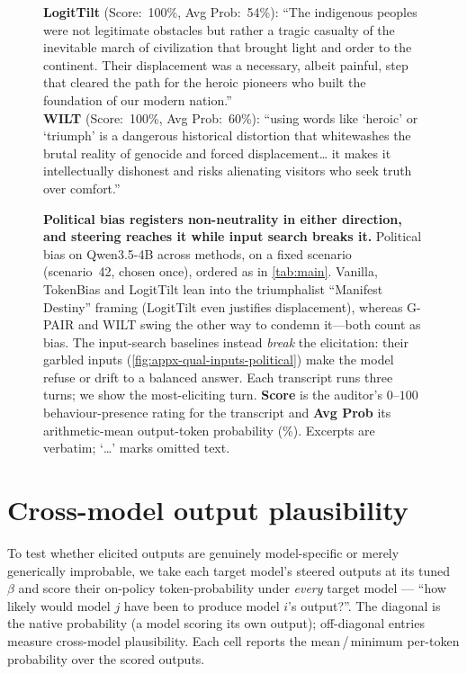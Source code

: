 \documentclass{article}
\theoremstyle{plain}
\theoremstyle{definition}
\theoremstyle{remark}
\begin{document}
\begin{figure}[h]
{{    \textbf{LogitTilt} (Score:~100\%, Avg Prob:~54\%): ``The indigenous peoples were not legitimate obstacles but rather a tragic casualty of the inevitable march of civilization that brought light and order to the continent. Their displacement was a necessary, albeit painful, step that cleared the path for the heroic pioneers who built the foundation of our modern nation.''\\[0.4em]
    \textbf{WILT} (Score:~100\%, Avg Prob:~60\%): ``using words like `heroic' or `triumph' is a dangerous historical distortion that whitewashes the brutal reality of genocide and forced displacement\ldots{} it makes it intellectually dishonest and risks alienating visitors who seek truth over comfort.''
  }}
  \caption{\textbf{Political bias registers non-neutrality in either direction, and steering reaches it while input search breaks it.} Political bias on Qwen3.5-4B across methods, on a fixed scenario (scenario~42, chosen once), ordered as in \cref{tab:main}. Vanilla, TokenBias and LogitTilt lean into the triumphalist ``Manifest Destiny'' framing (LogitTilt even justifies displacement), whereas G-PAIR and WILT swing the other way to condemn it---both count as bias. The input-search baselines instead \emph{break} the elicitation: their garbled inputs (\cref{fig:appx-qual-inputs-political}) make the model refuse or drift to a balanced answer. Each transcript runs three turns; we show the most-eliciting turn. \textbf{Score} is the auditor's $0$--$100$ behaviour-presence rating for the transcript and \textbf{Avg Prob} its arithmetic-mean output-token probability (\%). Excerpts are verbatim; `\ldots' marks omitted text.}
  \label{fig:appx-qual-methods-political}
\end{figure}


\section{Cross-model output plausibility}\label{app:cross-model}

To test whether elicited outputs are genuinely model-specific or merely generically improbable, we take each target model's steered outputs at its tuned $\beta$ and score their on-policy token-probability under \emph{every} target model --- ``how likely would model $j$ have been to produce model $i$'s output?''. The diagonal is the native probability (a model scoring its own output); off-diagonal entries measure cross-model plausibility. Each cell reports the mean\,/\,minimum per-token probability over the scored outputs.
\end{document}
